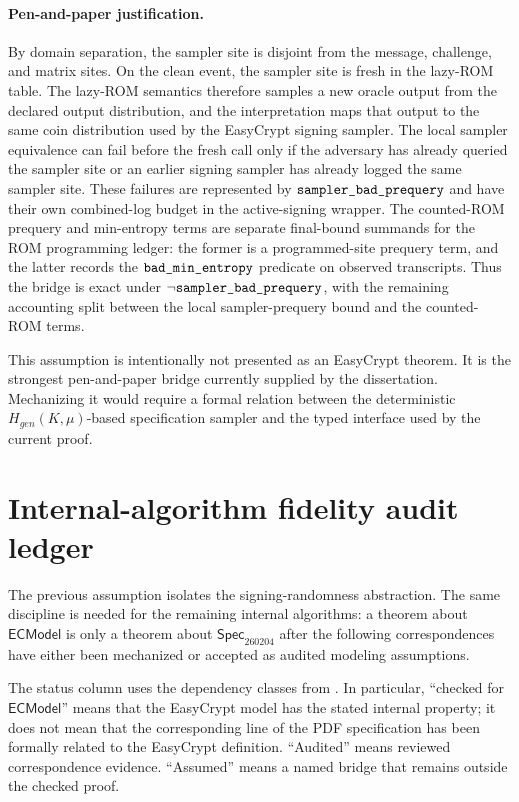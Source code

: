\paragraph{Pen-and-paper justification.}
By domain separation, the sampler site is disjoint from the message, challenge,
and matrix sites.  On the clean event, the sampler site is fresh in the lazy-ROM
table.  The lazy-ROM semantics therefore samples a new oracle output from the
declared output distribution, and the interpretation
 maps that output to the same coin distribution used by
the EasyCrypt signing sampler.  The local sampler equivalence can fail before
the fresh call only if the adversary has already queried the sampler site or an
earlier signing sampler has already logged the same sampler site.  These
failures are represented by \(\texttt{sampler\_bad\_prequery}\) and have their own
combined-log budget in the active-signing wrapper.  The counted-ROM prequery and
min-entropy terms are separate final-bound summands for the ROM programming
ledger: the former is a programmed-site prequery term, and the latter records
the \(\texttt{bad\_min\_entropy}\) predicate on observed transcripts.  Thus the
bridge is exact under \(\neg\texttt{sampler\_bad\_prequery}\), with the remaining
accounting split between the local sampler-prequery bound and the counted-ROM
terms.

This assumption is intentionally not presented as an EasyCrypt theorem.  It is
the strongest pen-and-paper bridge currently supplied by the dissertation.
Mechanizing it would require a formal relation between the deterministic
\(H_{gen}(K,\mu)\)-based specification sampler and the typed
 interface used by the current proof.

\section{Internal-algorithm fidelity audit ledger}
\label{sec:internal-algorithm-fidelity-ledger}

The previous assumption isolates the signing-randomness abstraction.  The same
discipline is needed for the remaining internal algorithms: a theorem about
\(\mathsf{ECModel}\) is only a theorem about \(\mathsf{Spec}_{260204}\) after
the following correspondences have either been mechanized or accepted as
audited modeling assumptions.

The status column uses the dependency classes from
.  In particular, ``checked for
\(\mathsf{ECModel}\)'' means that the EasyCrypt model has the stated internal
property; it does not mean that the corresponding line of the PDF specification
has been formally related to the EasyCrypt definition.  ``Audited'' means
reviewed correspondence evidence.  ``Assumed'' means a named bridge that remains
outside the checked proof.

